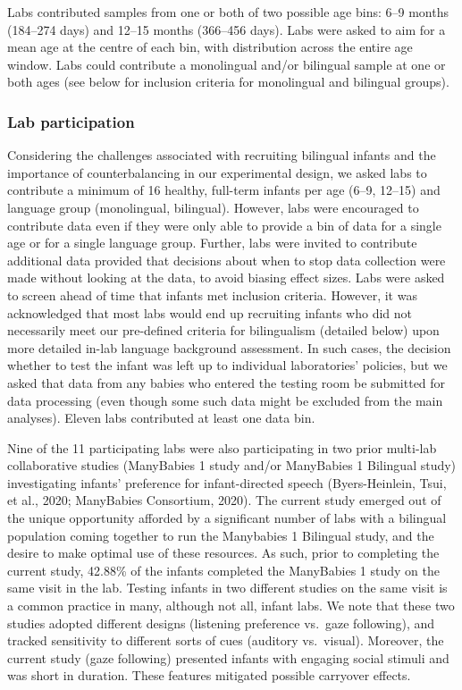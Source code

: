 \documentclass[,man,floatsintext]{apa6}
\begin{document}
Labs contributed samples from one or both of two possible age bins: 6--9 months (184--274 days) and 12--15 months (366--456 days). Labs were asked to aim for a mean age at the centre of each bin, with distribution across the entire age window. Labs could contribute a monolingual and/or bilingual sample at one or both ages (see below for inclusion criteria for monolingual and bilingual groups).

\hypertarget{lab-participation}{%
\subsubsection{Lab participation}\label{lab-participation}}

Considering the challenges associated with recruiting bilingual infants and the importance of counterbalancing in our experimental design, we asked labs to contribute a minimum of 16 healthy, full-term infants per age (6--9, 12--15) and language group (monolingual, bilingual). However, labs were encouraged to contribute data even if they were only able to provide a bin of data for a single age or for a single language group. Further, labs were invited to contribute additional data provided that decisions about when to stop data collection were made without looking at the data, to avoid biasing effect sizes. Labs were asked to screen ahead of time that infants met inclusion criteria. However, it was acknowledged that most labs would end up recruiting infants who did not necessarily meet our pre-defined criteria for bilingualism (detailed below) upon more detailed in-lab language background assessment. In such cases, the decision whether to test the infant was left up to individual laboratories' policies, but we asked that data from any babies who entered the testing room be submitted for data processing (even though some such data might be excluded from the main analyses). Eleven labs contributed at least one data bin.

Nine of the 11 participating labs were also participating in two prior multi-lab collaborative studies (ManyBabies 1 study and/or ManyBabies 1 Bilingual study) investigating infants' preference for infant-directed speech (Byers-Heinlein, Tsui, et al., 2020; ManyBabies Consortium, 2020). The current study emerged out of the unique opportunity afforded by a significant number of labs with a bilingual population coming together to run the Manybabies 1 Bilingual study, and the desire to make optimal use of these resources. As such, prior to completing the current study, 42.88\% of the infants completed the ManyBabies 1 study on the same visit in the lab. Testing infants in two different studies on the same visit is a common practice in many, although not all, infant labs. We note that these two studies adopted different designs (listening preference vs.~gaze following), and tracked sensitivity to different sorts of cues (auditory vs.~visual). Moreover, the current study (gaze following) presented infants with engaging social stimuli and was short in duration. These features mitigated possible carryover effects.
\end{document}
